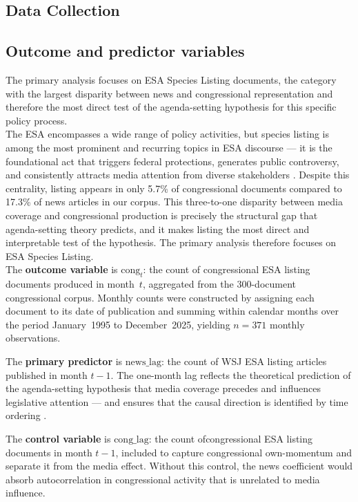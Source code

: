 \documentclass[11pt]{article}
\begin{document}
\subsection{Data Collection}

\subsection{Outcome and predictor variables}
 
The primary analysis focuses on ESA Species Listing documents, the category with the largest disparity between news and congressional representation and therefore the most direct test of the agenda-setting
hypothesis for this specific policy process.\\

The ESA encompasses a wide range of policy activities, but species listing is among the most prominent and recurring topics in ESA discourse — it is the foundational act that triggers federal protections, generates public controversy, and consistently attracts media attention from diverse stakeholders \citep{Repetto2006}. Despite this centrality, listing appears in only 5.7\% of congressional documents compared to 17.3\% of news articles in our corpus. This three-to-one disparity between media coverage and congressional production is precisely the structural gap that agenda-setting theory predicts, and it makes listing the most direct and interpretable test of the hypothesis. The primary analysis therefore focuses on ESA Species Listing.\\

The \textbf{outcome variable} is $\text{cong}_{t}$: the count of congressional ESA listing documents produced in month~$t$, aggregated from the 300-document congressional corpus. Monthly counts were
constructed by assigning each document to its date of publication and summing within calendar months over the period January~1995 to December~2025, yielding $n = 371$ monthly observations.
 
The \textbf{primary predictor} is $\text{news\_lag}$: the count of WSJ ESA listing articles published in month $t{-}1$. The one-month lag reflects the theoretical prediction of the agenda-setting hypothesis
that media coverage precedes and influences legislative attention --- and ensures that the causal direction is identified by time ordering \citep{Granger1969}.
 
The \textbf{control variable} is $\text{cong\_lag}$: the count ofcongressional ESA listing documents in month $t{-}1$, included to capture congressional own-momentum and separate it from the media
effect. Without this control, the news coefficient would absorb autocorrelation in congressional activity that is unrelated to media influence.
\end{document}

